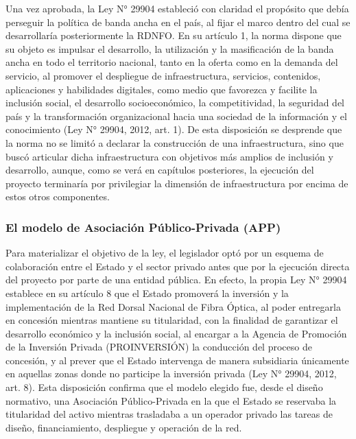 Una vez aprobada, la Ley N° 29904 estableció con claridad el propósito que debía perseguir la política de banda ancha en el país, al fijar el marco dentro del cual se desarrollaría posteriormente la RDNFO. En su artículo 1, la norma dispone que su objeto es impulsar el desarrollo, la utilización y la masificación de la banda ancha en todo el territorio nacional, tanto en la oferta como en la demanda del servicio, al promover el despliegue de infraestructura, servicios, contenidos, aplicaciones y habilidades digitales, como medio que favorezca y facilite la inclusión social, el desarrollo socioeconómico, la competitividad, la seguridad del país y la transformación organizacional hacia una sociedad de la información y el conocimiento (Ley N° 29904, 2012, art. 1). De esta disposición se desprende que la norma no se limitó a declarar la construcción de una infraestructura, sino que buscó articular dicha infraestructura con objetivos más amplios de inclusión y desarrollo, aunque, como se verá en capítulos posteriores, la ejecución del proyecto terminaría por privilegiar la dimensión de infraestructura por encima de estos otros componentes.

\subsubsection{El modelo de Asociación Público-Privada (APP)}
Para materializar el objetivo de la ley, el legislador optó por un esquema de colaboración entre el Estado y el sector privado antes que por la ejecución directa del proyecto por parte de una entidad pública. En efecto, la propia Ley N° 29904 establece en su artículo 8 que el Estado promoverá la inversión y la implementación de la Red Dorsal Nacional de Fibra Óptica, al poder entregarla en concesión mientras mantiene su titularidad, con la finalidad de garantizar el desarrollo económico y la inclusión social, al encargar a la Agencia de Promoción de la Inversión Privada (PROINVERSIÓN) la conducción del proceso de concesión, y al prever que el Estado intervenga de manera subsidiaria únicamente en aquellas zonas donde no participe la inversión privada (Ley N° 29904, 2012, art. 8). Esta disposición confirma que el modelo elegido fue, desde el diseño normativo, una Asociación Público-Privada en la que el Estado se reservaba la titularidad del activo mientras trasladaba a un operador privado las tareas de diseño, financiamiento, despliegue y operación de la red.

